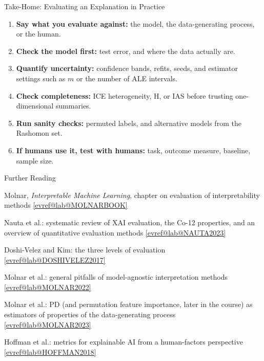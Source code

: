 \documentclass[10pt,compress,t,notes=noshow,xcolor=table]{beamer}
\makeatletter
\newcommand{\citeref}[1]{%
  \href{\csname evref@url@#1\endcsname}{[\csname evref@lab@#1\endcsname]}}
\makeatother
\begin{document}

\begin{framev}[align=top]{Take-Home: Evaluating an Explanation in Practice}
\begin{enumerate}\setlength{\itemsep}{0.5em}
\item \textbf{Say what you evaluate against:} the model, the data-generating process, or the human.
\item \textbf{Check the model first:} test error, and where the data actually are.
\item \textbf{Quantify uncertainty:} confidence bands, refits, seeds, and estimator settings such as $m$ or the number of ALE intervals.
\item \textbf{Check completeness:} ICE heterogeneity, H, or IAS before trusting one-dimensional summaries.
\item \textbf{Run sanity checks:} permuted labels, and alternative models from the Rashomon set.
\item \textbf{If humans use it, test with humans:} task, outcome measure, baseline, sample size.
\end{enumerate}
\end{framev}


\begin{framev}[align=top]{Further Reading}
\begin{itemizeM}
\item Molnar, \emph{Interpretable Machine Learning}, chapter on evaluation of interpretability methods \citeref{MOLNARBOOK}
\item Nauta et al.: systematic review of XAI evaluation, the Co-12 properties, and an overview of quantitative evaluation methods \citeref{NAUTA2023}
\item Doshi-Velez and Kim: the three levels of evaluation \citeref{DOSHIVELEZ2017}
\item Molnar et al.: general pitfalls of model-agnostic interpretation methods \citeref{MOLNAR2022}
\item Molnar et al.: PD (and permutation feature importance, later in the course) as estimators of properties of the data-generating process \citeref{MOLNAR2023}
\item Hoffman et al.: metrics for explainable AI from a human-factors perspective \citeref{HOFFMAN2018}
\end{itemizeM}
\end{framev}
\end{document}
